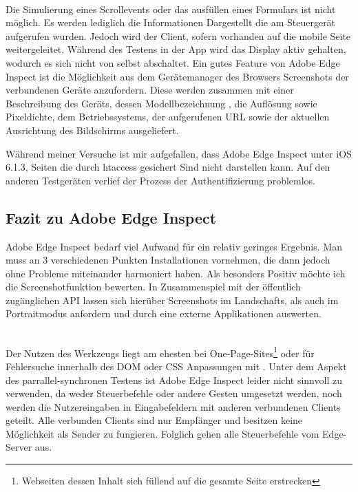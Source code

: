 		\\Die Simulierung eines Scrollevents oder das ausfüllen eines Formulars ist nicht möglich. Es werden lediglich die 				Informationen Dargestellt die am Steuergerät aufgerufen wurden. Jedoch wird der Client, sofern vorhanden auf die mobile 		Seite weitergeleitet. Während des Testens in der App wird das Display aktiv gehalten, wodurch es sich nicht von selbst 			abschaltet. Ein gutes Feature von Adobe Edge Inspect ist die Möglichkeit aus dem Gerätemanager des Browsers 				Screenshots der verbundenen Geräte anzufordern. Diese werden zusammen mit einer Beschreibung des Geräts, dessen 		Modellbezeichnung , die Auflösung sowie Pixeldichte, dem Betriebssystems, der aufgerufenen URL sowie der aktuellen 			Ausrichtung des Bildschirms ausgeliefert.
		
		Während meiner Versuche ist mir aufgefallen, dass Adobe Edge Inspect unter iOS 6.1.3, Seiten die durch htaccess 				gesichert Sind nicht darstellen kann. Auf den anderen Testgeräten verlief der Prozess der Authentifizierung problemlos. 
		
		\pagebreak
		\subsection{Fazit zu Adobe Edge Inspect}
		Adobe Edge Inspect bedarf viel Aufwand für ein relativ geringes Ergebnis. Man muss an 3 verschiedenen Punkten 				Installationen vornehmen, die dann jedoch ohne Probleme miteinander harmoniert haben. Als besonders Positiv möchte ich 		die Screenshotfunktion bewerten. In Zusammenspiel mit der öffentlich zugänglichen API lassen sich hierüber Screenshots 		im Landschafts, als auch im Portraitmodus anfordern und durch eine externe Applikationen auswerten. 
		
		\\Der Nutzen des Werkzeugs liegt am ehesten bei One-Page-Sites\footnote{Webseiten dessen Inhalt sich füllend auf die 			gesamte Seite erstrecken} oder für Fehlersuche innerhalb des DOM oder CSS Anpassungen mit . Unter dem 		Aspekt 	des parrallel-synchronen Testens ist Adobe Edge Inspect leider nicht sinnvoll zu verwenden, da weder 				Steuerbefehle oder 		andere Gesten umgesetzt werden, noch werden die Nutzereingaben in Eingabefeldern mit 			anderen verbundenen Clients geteilt. 	Alle verbunden Clients sind nur Empfänger und besitzen keine Möglichkeit 			als 			Sender zu fungieren. Folglich gehen alle 			Steuerbefehle vom Edge-Server aus.
	
